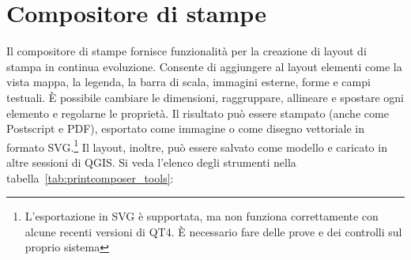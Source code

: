 
\chapter{Compositore di stampe}\label{label_printcomposer}


Il compositore di stampe fornisce funzionalità per la creazione di layout di
stampa in continua evoluzione. Consente di aggiungere al layout elementi
come la vista mappa, la legenda, la barra di scala, immagini esterne, forme
e campi testuali. È possibile cambiare le dimensioni, raggruppare, allineare 
e spostare ogni elemento e regolarne le proprietà. 
Il risultato può essere stampato (anche come Postscript e PDF), esportato come
immagine o come disegno vettoriale in formato SVG.\footnote{L'esportazione in
SVG è supportata, ma non funziona correttamente con alcune recenti versioni di
QT4. È necessario fare delle prove e dei controlli sul proprio
sistema} Il layout, inoltre, può essere salvato come modello e caricato in 
altre sessioni di QGIS.
Si veda l'elenco degli strumenti nella tabella~\ref{tab:printcomposer_tools}:

